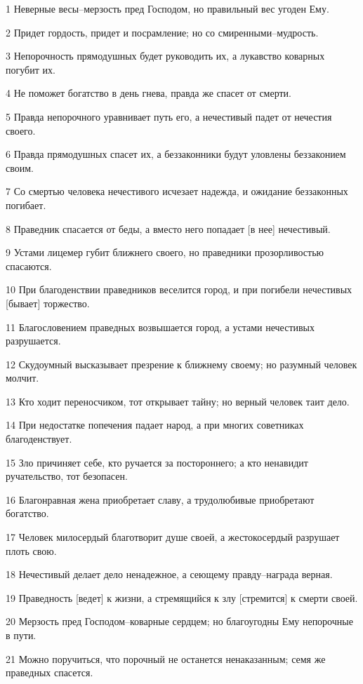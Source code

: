 \par 1 Неверные весы--мерзость пред Господом, но правильный вес угоден Ему.
\par 2 Придет гордость, придет и посрамление; но со смиренными--мудрость.
\par 3 Непорочность прямодушных будет руководить их, а лукавство коварных погубит их.
\par 4 Не поможет богатство в день гнева, правда же спасет от смерти.
\par 5 Правда непорочного уравнивает путь его, а нечестивый падет от нечестия своего.
\par 6 Правда прямодушных спасет их, а беззаконники будут уловлены беззаконием своим.
\par 7 Со смертью человека нечестивого исчезает надежда, и ожидание беззаконных погибает.
\par 8 Праведник спасается от беды, а вместо него попадает [в нее] нечестивый.
\par 9 Устами лицемер губит ближнего своего, но праведники прозорливостью спасаются.
\par 10 При благоденствии праведников веселится город, и при погибели нечестивых [бывает] торжество.
\par 11 Благословением праведных возвышается город, а устами нечестивых разрушается.
\par 12 Скудоумный высказывает презрение к ближнему своему; но разумный человек молчит.
\par 13 Кто ходит переносчиком, тот открывает тайну; но верный человек таит дело.
\par 14 При недостатке попечения падает народ, а при многих советниках благоденствует.
\par 15 Зло причиняет себе, кто ручается за постороннего; а кто ненавидит ручательство, тот безопасен.
\par 16 Благонравная жена приобретает славу, а трудолюбивые приобретают богатство.
\par 17 Человек милосердый благотворит душе своей, а жестокосердый разрушает плоть свою.
\par 18 Нечестивый делает дело ненадежное, а сеющему правду--награда верная.
\par 19 Праведность [ведет] к жизни, а стремящийся к злу [стремится] к смерти своей.
\par 20 Мерзость пред Господом--коварные сердцем; но благоугодны Ему непорочные в пути.
\par 21 Можно поручиться, что порочный не останется ненаказанным; семя же праведных спасется.
